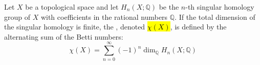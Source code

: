 \begin{definition} \label{definition:euler_characteristic_of_a_topological_space}
Let $X$ be a topological space and let $H_n(X; \mathbb{Q})$ be the $n$-th singular homology group of $X$ with coefficients in the rational numbers $\mathbb{Q}$. If the total dimension of the singular homology is finite, the , denoted \hl{$\chi(X)$}, is defined by the alternating sum of the Betti numbers:
$$\chi(X) = \sum_{n=0}^{\infty} (-1)^n \dim_{\mathbb{Q}} H_n(X; \mathbb{Q})$$
\end{definition}